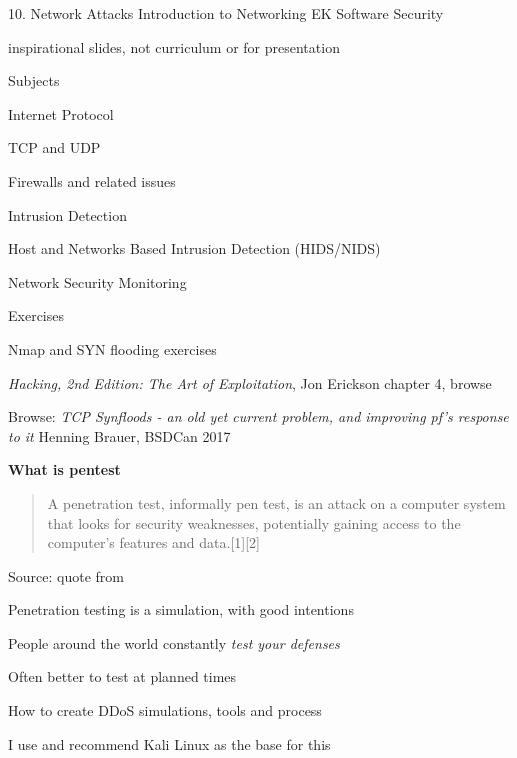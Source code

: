 \documentclass[Screen16to9,17pt]{foils}
\begin{document}
\mytitlepage
{10. Network Attacks Introduction to Networking}
{EK  Software Security}

\centerline{\Large \color{red} inspirational slides, not curriculum or for presentation}



\begin{list1}
\item Subjects
\begin{list2}
\item Internet Protocol
\item TCP and UDP
\item Firewalls and related issues
\item Intrusion Detection
\item Host and Networks Based Intrusion Detection (HIDS/NIDS)
\item Network Security Monitoring
\end{list2}
\item Exercises
\begin{list2}
\item Nmap and SYN flooding exercises
\end{list2}
\end{list1}



\begin{list1}
\item \emph{Hacking, 2nd Edition: The Art of Exploitation}, Jon Erickson chapter 4, browse
\item Browse: \emph{TCP Synfloods - an old yet current problem, and improving pf's response to it}
Henning Brauer, BSDCan 2017 
\end{list1}




{\bf What is pentest}

\begin{quote}
A penetration test, informally pen test, is an attack on a computer system that looks for security weaknesses, potentially gaining access to the computer's features and data.[1][2]
\end{quote}
Source: quote from 

\begin{list1}
\item Penetration testing is a simulation, with good intentions
\item People around the world constantly \emph{test your defenses}
\item Often better to test at planned times
\item How to create DDoS simulations, tools and process
\item I use and recommend Kali Linux as the base for this
\end{list1}
\end{document}
